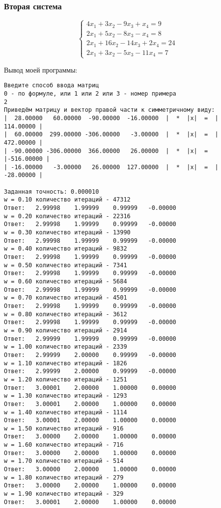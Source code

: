 \documentclass[a4paper,12pt,titlepage,finall]{article}
\begin{document}
\subsubsection{Вторая система}

\begin{equation*}
 \begin{cases}
   4x_1 + 3x_2 - 9x_3 + x_4 = 9
   \\
   2x_1 + 5x_2 - 8x_3 - x_4 = 8
   \\
   2x_1 + 16x_2 - 14x_3 + 2x_4 = 24
   \\
   2x_1 + 3x_2 - 5x_3  - 11x_4 = 7
 \end{cases}
\end{equation*}


Вывод моей программы:

\begin{verbatim}
Введите способ ввода матриц
0 - по формуле, или 1 или 2 или 3 - номер примера
2
Приведём матрицу и вектор правой части к симметричному виду:
|  28.00000   60.00000  -90.00000  -16.00000  |  *  |x|  =  | 114.00000 |
|  60.00000  299.00000 -306.00000   -3.00000  |  *  |x|  =  | 472.00000 |
| -90.00000 -306.00000  366.00000   26.00000  |  *  |x|  =  |-516.00000 |
| -16.00000   -3.00000   26.00000  127.00000  |  *  |x|  =  | -28.00000 |

Заданная точность: 0.000010
w = 0.10 количество итераций - 47312
Ответ:   2.99998    1.99999    0.99999   -0.00000 
w = 0.20 количество итераций - 22316
Ответ:   2.99998    1.99999    0.99999   -0.00000 
w = 0.30 количество итераций - 13990
Ответ:   2.99998    1.99999    0.99999   -0.00000 
w = 0.40 количество итераций - 9832
Ответ:   2.99998    1.99999    0.99999   -0.00000 
w = 0.50 количество итераций - 7341
Ответ:   2.99998    1.99999    0.99999   -0.00000 
w = 0.60 количество итераций - 5684
Ответ:   2.99998    1.99999    0.99999   -0.00000 
w = 0.70 количество итераций - 4501
Ответ:   2.99998    1.99999    0.99999   -0.00000 
w = 0.80 количество итераций - 3612
Ответ:   2.99998    1.99999    0.99999   -0.00000 
w = 0.90 количество итераций - 2914
Ответ:   2.99999    1.99999    0.99999   -0.00000 
w = 1.00 количество итераций - 2339
Ответ:   2.99999    2.00000    0.99999   -0.00000 
w = 1.10 количество итераций - 1826
Ответ:   2.99999    2.00000    0.99999   -0.00000 
w = 1.20 количество итераций - 1251
Ответ:   3.00001    2.00000    1.00000    0.00000 
w = 1.30 количество итераций - 1293
Ответ:   3.00001    2.00000    1.00000    0.00000 
w = 1.40 количество итераций - 1114
Ответ:   3.00001    2.00000    1.00000    0.00000 
w = 1.50 количество итераций - 916
Ответ:   3.00000    2.00000    1.00000    0.00000 
w = 1.60 количество итераций - 716
Ответ:   3.00000    2.00000    1.00000    0.00000 
w = 1.70 количество итераций - 514
Ответ:   3.00000    2.00000    1.00000    0.00000 
w = 1.80 количество итераций - 279
Ответ:   3.00000    2.00000    1.00000    0.00000 
w = 1.90 количество итераций - 329
Ответ:   3.00001    2.00000    1.00000    0.00000 

\end{verbatim}
\end{document}

